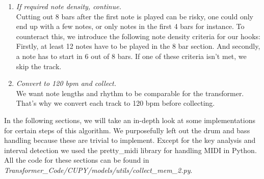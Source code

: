 \documentclass[a4paper,12pt]{extarticle}
\begin{document}
\begin{enumerate}
    \item \textit{If required note density, continue.}\\[0.2cm]
    Cutting out 8 bars after the first note is played can be risky, one could only end up with a few notes, or only notes in the first 4 bars for instance. To counteract this, we introduce the following note density criteria for our hooks:
    Firstly, at least 12 notes have to be played in the 8 bar section. And secondly, a note has to start in 6 out of 8 bars. If one of these criteria isn't met, we skip the track.
    \item \textit{Convert to 120 bpm and collect.} \\[0.2cm]
    We want note lengths and rhythm to be comparable for the transformer. That's why we convert each track to 120 bpm before collecting.

\end{enumerate}

In the following sections, we will take an in-depth look at some implementations for certain steps of this algorithm. We purposefully left out the drum and bass handling because these are trivial to implement. Except for the key analysis and interval detection we used the pretty\_midi library for handling MIDI in Python. All the code for these sections can be found in \textit{Transformer\_Code/CUPY/models/utils/collect\_mem\_2.py}.
\end{document}
